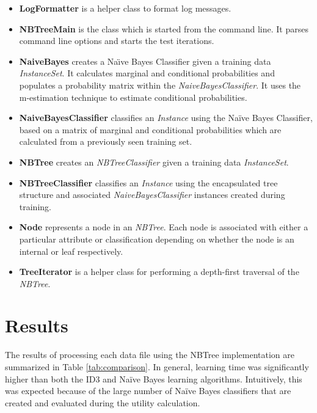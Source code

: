\documentclass[10pt]{report}
\begin{document}
\begin{itemize}
\item \textbf{LogFormatter} is a helper class to format log messages.

\item \textbf{NBTreeMain} is the class which is started from the command
  line. It parses command line options and starts the test iterations.

\item \textbf{NaiveBayes} creates a Na\"{\i}ve Bayes Classifier
  given a training data \textit{InstanceSet}. It calculates marginal
  and conditional probabilities and populates a probability matrix
  within the \textit{NaiveBayesClassifier}. It uses the m-estimation
  technique to estimate conditional probabilities.

\item \textbf{NaiveBayesClassifier} classifies an \textit{Instance}
  using the Na\"{i}ve Bayes Classifier, based on a matrix of
  marginal and conditional probabilities which are calculated from a
  previously seen training set.

\item \textbf{NBTree} creates an \textit{NBTreeClassifier} given a
  training data \textit{InstanceSet}.

\item \textbf{NBTreeClassifier} classifies an \textit{Instance}
  using the encapsulated tree structure and associated
  \textit{NaiveBayesClassifier} instances created during training.

\item \textbf{Node} represents a node in an \textit{NBTree}. Each node is
  associated with either a particular attribute or classification
  depending on whether the node is an internal or leaf
  respectively. 

\item \textbf{TreeIterator} is a helper class for performing a
  depth-first traversal of the \textit{NBTree}.

\end{itemize}


\section{Results}
\label{sec:results}
The results of processing each data file using the NBTree
implementation are summarized in Table 
\ref{tab:comparison}. In general, learning time was significantly
higher than both the ID3 and Na\"{i}ve Bayes learning
algorithms. Intuitively, this was expected because of the large number
of Na\"{i}ve Bayes classifiers that are created and evaluated during
the utility calculation.
\end{document}
